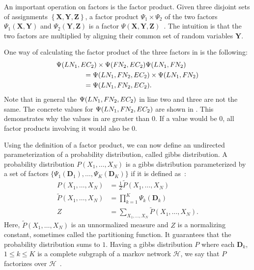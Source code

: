 An important operation on factors is the \gls{factor product}.
Given three disjoint sets of \glspl{assignment} $\left\{\mathbf{X}, \mathbf{Y}, \mathbf{Z}\right\}$, a \gls{factor product} $\Psi_1\times\Psi_2$ of the two factors $\Psi_1(\mathbf{X},\mathbf{Y})$ and $\Psi_2(\mathbf{Y},\mathbf{Z})$ is a factor $\Psi(\mathbf{X},\mathbf{Y},\mathbf{Z})$~\citep{koller2009probabilistic}.
The intuition is that the two factors are multiplied by aligning their common set of \glspl{random variable} $\mathbf{Y}$.

One way of calculating the \gls{factor product} of the three \glspl{factor} in  is the following:
\begin{equation*}
  \begin{split}
  &\Psi(LN_1,EC_2)\times\Psi(F\hspace{-0.07em} N_2,EC_2)\Psi(LN_1,F\hspace{-0.07em} N_2)\\
  &\hspace{4em}=\Psi(LN_1,F\hspace{-0.07em} N_2,EC_2)\times\Psi(LN_1,F\hspace{-0.07em} N_2)\\
  &\hspace{4em}=\Psi(LN_1,F\hspace{-0.07em} N_2,EC_2).
  \end{split}
\end{equation*}
Note that in general the $\Psi(LN_1,F\hspace{-0.07em} N_2,EC_2)$ in line two and three are not the same.
The concrete values for $\Psi(LN_1,F\hspace{-0.07em} N_2,EC_2)$ are shown in .
This demonstrates why the values in  are greater than $0$.
If a value would be $0$, all factor products involving it would also be $0$.

\bigskip

Using the definition of a \gls{factor product}, we can now define an undirected parameterization of a \gls{probability distribution}, called \gls{gibbs distribution}.
A \gls{probability distribution} $P(X_1,\dots,X_N)$ is a \gls{gibbs distribution} parameterized by a set of \glspl{factor} $\{\Psi_1(\mathbf{D}_1),\dots,\Psi_K(\mathbf{D}_K)\}$ if it is defined as~\citep{koller2009probabilistic}:
\begin{equation}
  \label{equ:gibbs-distribution}
  \begin{split}
  P\left(X_1,\dots,X_N\right) & =\frac{1}{Z}\tilde{P}\left(X_1,\dots,X_N\right) \\
  \tilde{P}\left(X_1,\dots,X_N\right) & =\prod_{k=1}^{K}\Psi_k\left(\mathbf{D}_k\right) \\
  Z & =\sum_{X_1,\ldots,X_N}\tilde{P}\left(X_1,\dots,X_N\right).
  \end{split}
\end{equation}
Here, $\tilde{P}(X_1,\dots,X_N)$ is an unnormalized measure and $Z$ is a \gls{normalizing constant}, sometimes called the \gls{partitioning function}.
It guarantees that the \gls{probability distribution} sums to $1$.
Having a \gls{gibbs distribution} $P$ where each $\mathbf{D}_k$, $1\leq k \leq K$ is a complete subgraph of a \gls{markov network} $\mathcal{H}$, we say that $P$ factorizes over $\mathcal{H}$~\citep{koller2009probabilistic}.

